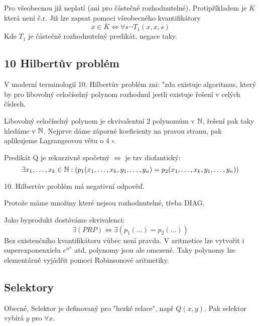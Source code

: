 \begin{note}
	Pro všeobecnou již neplatí (ani pro částečně rozhodnutelné).
	Protipříkladem je $\overline{K}$ která není č.r.
	Již lze zapsat pomoci všeobecného kvantifikátory
	\[ x \in \overline{K} \iff \forall s \neg T_1(x, x, s) \]
	Kde $T_1$ je částečně rozhodnutelný predikát, negace taky.
\end{note}

\subsection{10 Hilbertův problém}

V moderní terminologií 10. Hilbertův problém zni: "zda existuje algoritmus, který by pro libovolný celočíselný polynom rozhodnul jestli existuje řešení v celých číslech.

Libovolný celočíselný polynom je ekvivalentní 2 polynomům v $\operatorname{\mathbb{N}}$, řešení pak taky hledáme v $\operatorname{\mathbb{N}}$.
Nejprve dáme záporné koeficienty na pravou stranu, pak aplikujeme Lagrangeovou větu o 4 $\square$.

\begin{theorem}[RDPM (BD)]\label{rdpm}
	Predikát Q je rekurzivně spočetný $\iff$ je tzv diofantický:
		\[ \exists x_1, \ldots, x_k \in \operatorname{\mathbb{N}}: (p_1(x_1, \ldots, x_k, y_1, \ldots, y_n) = p_2(x_1, \ldots, x_k, y_1, \ldots, y_n)) \]
\end{theorem}

\begin{consequence}
	10. Hilbertův problém má negativní odpověď.

	Protože máme množiny které nejsou rozhodnutelné, třeba DIAG.
\end{consequence}

\begin{amendment}\label{rdpm_am}
	Jako byprodukt dostáváme ekvivalenci:
	\[ \exists(PRP) \iff \exists(p_1(\ldots) = p_2(\ldots)) \]
	Bez existenčního kvantifikátoru vůbec není pravda.
	V aritmetice lze vytvořit i superexponenxielu $e^{n^n}$ atd, polynomy jsou ale omezené.
	Taky polynomy lze elementárně vyjádřit pomoci Robinsonové aritmetiky.
\end{amendment}

\subsection{Selektory}

Obecné, Selektor je definovaný pro "hezké relace", např $Q(x, y)$.
Pak selektor vybírá $y$ pro $\forall x$.

